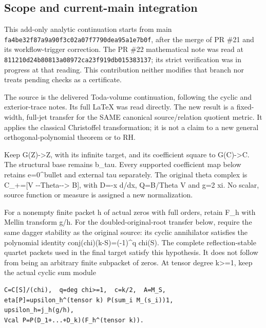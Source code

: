 \subsection[\hspace{0.4em}Scope and current-main
integration]{Scope and current-main
integration}\label{confluent-transfer-scope-and-current-main-integration}

This add-only analytic continuation starts from main
\texttt{fa4be32f\allowbreak{}87a9a90f\allowbreak{}3c02a07f\allowbreak{}7790dea9\allowbreak{}5a1e7b0f}, after the merge of PR
\#21 and its workflow-trigger correction. The PR \#22 mathematical note
was read at \texttt{811210d2\allowbreak{}4b80813a\allowbreak{}08972ca2\allowbreak{}3f919db0\allowbreak{}15383137}; its
strict verification was in progress at that reading. This contribution
neither modifies that branch nor treats pending checks as a certificate.

The source is the delivered Toda-volume continuation, following the
cyclic and exterior-trace notes. Its full LaTeX was read directly. The
new result is a fixed-width, full-jet transfer for the SAME canonical
source/relation quotient metric. It applies the classical Christoffel
transformation; it is not a claim to a new general orthogonal-polynomial
theorem or to RH.

Keep G(Z)-\textgreater Z, with its infinite target, and its coefficient
square to G(C)-\textgreater C. The structural base remains b\_tau. Every
supported coefficient map below retains e=0\^{}bullet and external tau
separately. The original theta complex is C\_+={[}V
-\/-Theta-\/-\textgreater{} B{]}, with D=-x d/dx, Q=B/Theta V and g=2
xi. No scalar, source function or measure is assigned a new
normalization.

For a nonempty finite packet h of actual zeros with full orders, retain
F\_h with Mellin transform g/h. For the doubled-original-root transfer
below, require the same dagger stability as the original source: its
cyclic annihilator satisfies the polynomial identity
conj(chi)(k-S)=(-1)\^{}q chi(S). The complete reflection-stable quartet
packets used in the final target satisfy this hypothesis. It does not
follow from being an arbitrary finite subpacket of zeros. At tensor
degree k\textgreater=1, keep the actual cyclic sum module

\begin{Verbatim}[breaklines=true,breakanywhere=true,fontsize=\small]
C=C[S]/(chi),  q=deg chi>=1,  c=k/2,  A=M_S,
eta[P]=upsilon_h^(tensor k) P(sum_i M_(s_i))1,
upsilon_h=j_h(g/h),
Vcal P=P(D_1+...+D_k)(F_h^(tensor k)).
\end{Verbatim}

